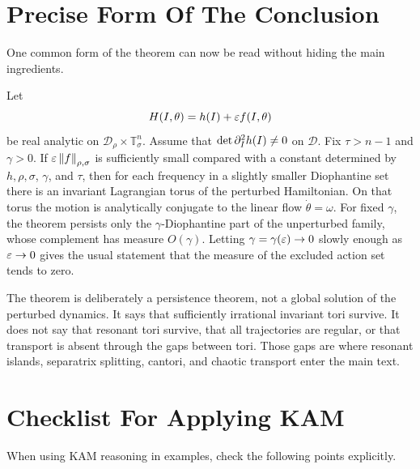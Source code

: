 \section{Precise Form Of The Conclusion}
\label{sec:kam-conclusion}

One common form of the theorem can now be read without hiding the main
ingredients.

\begin{proposition}
Let
\[
        H(I,\theta)=h(I)+\varepsilon f(I,\theta)
\]
be real analytic on
\(\mathcal{D}_\rho\times\mathbb{T}^n_\sigma\).  Assume that
\(\det \partial_I^2 h(I)\ne0\) on \(\mathcal{D}\).  Fix
\(\tau>n-1\) and \(\gamma>0\).  If \(\varepsilon\left\lVert f\right\rVert_{\rho,\sigma}\) is
sufficiently small compared with a constant determined by \(h,\rho,\sigma\),
\(\gamma\), and \(\tau\), then for each frequency in a slightly smaller
Diophantine set there is an invariant Lagrangian torus of the perturbed
Hamiltonian.  On that torus the motion is analytically conjugate to the linear
flow \(\dot\theta=\omega\).  For fixed \(\gamma\), the theorem persists only
the \(\gamma\)-Diophantine part of the unperturbed family, whose complement has
measure \(O(\gamma)\).  Letting \(\gamma=\gamma(\varepsilon)\to0\) slowly enough as
\(\varepsilon\to0\) gives the usual statement that the measure of the excluded action
set tends to zero.
\end{proposition}

The theorem is deliberately a persistence theorem, not a global solution of
the perturbed dynamics.  It says that sufficiently irrational invariant tori
survive.  It does not say that resonant tori survive, that all trajectories are
regular, or that transport is absent through the gaps between tori.  Those
gaps are where resonant islands, separatrix splitting, cantori, and chaotic
transport enter the main text.

\section{Checklist For Applying KAM}
\label{sec:kam-application-checklist}

When using KAM reasoning in examples, check the following points explicitly.

